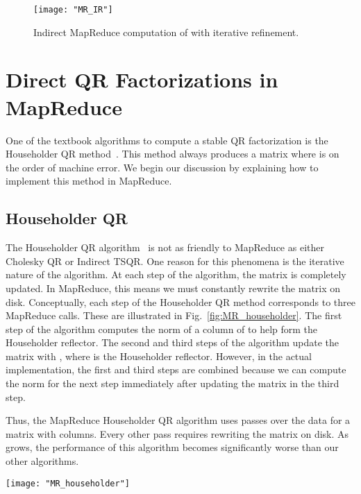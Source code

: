 \documentclass[10pt, conference, compsocconf]{IEEEtran}
\begin{document}
\begin{figure}[tbp]
\centering
\texttt{[image: "MR\_IR"]}
\caption{Indirect MapReduce computation of  with iterative refinement.}
\label{fig:MR_IR}
\end{figure}

\section{Direct QR Factorizations in MapReduce}\label{sec:direct_QR}

One of the textbook algorithms to compute a stable QR factorization
is the Householder QR method~\cite{golub1996-matrix}.  This method
always produces a matrix  where  is on 
the order of machine error.  We begin our discussion by explaining
how to implement this method in MapReduce.

\subsection{Householder QR}



The Householder QR algorithm~\cite{Trefethen1997-book} is not as friendly to MapReduce as either Cholesky QR or Indirect TSQR.  One reason for this phenomena is the iterative nature of the algorithm.  At each step of the algorithm, the matrix  is completely updated.  In MapReduce, this means we must constantly rewrite the matrix on disk.  Conceptually, each step of the Householder QR method corresponds to three MapReduce calls.  These are illustrated in Fig.~\ref{fig:MR_householder}.  The first step of the algorithm computes the norm of a column of  to help form the Householder reflector.  The second and third steps of the algorithm update the matrix with , where  is the Householder reflector.  However, in the actual implementation, the first and third steps are combined because we can compute the norm for the next step immediately after updating the matrix in the third step.  

Thus, the MapReduce Householder QR algorithm uses  passes over the data for a matrix  with  columns.  Every other pass requires rewriting the matrix on disk.  As  grows, the performance of this algorithm becomes significantly worse than our other algorithms.

\begin{figure*}
\centering
\texttt{[image: "MR\_householder"]}
\caption{Outline of MapReduce Householder QR.}
\label{fig:MR_householder}
\end{figure*}
\end{document}
